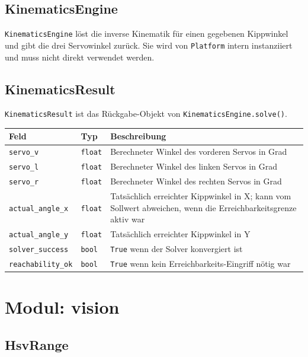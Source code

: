 \documentclass[11pt, a4paper]{scrreprt}
\begin{document}
\section{KinematicsEngine}

\texttt{KinematicsEngine} löst die inverse Kinematik für einen gegebenen
Kippwinkel und gibt die drei Servowinkel zurück.
Sie wird von \texttt{Platform} intern instanziiert und muss nicht
direkt verwendet werden.

\section{KinematicsResult}

\texttt{KinematicsResult} ist das Rückgabe-Objekt von \texttt{KinematicsEngine.solve()}.

\begin{tabularx}{\textwidth}{l l X}
  \toprule
  Feld & Typ & Beschreibung \\
  \midrule
  \texttt{servo\_v} & \texttt{float} & Berechneter Winkel des vorderen Servos in Grad \\
  \texttt{servo\_l} & \texttt{float} & Berechneter Winkel des linken Servos in Grad \\
  \texttt{servo\_r} & \texttt{float} & Berechneter Winkel des rechten Servos in Grad \\
  \texttt{actual\_angle\_x} & \texttt{float} & Tatsächlich erreichter Kippwinkel in X; kann vom Sollwert abweichen, wenn die Erreichbarkeitsgrenze aktiv war \\
  \texttt{actual\_angle\_y} & \texttt{float} & Tatsächlich erreichter Kippwinkel in Y \\
  \texttt{solver\_success} & \texttt{bool} & \texttt{True} wenn der Solver konvergiert ist \\
  \texttt{reachability\_ok} & \texttt{bool} & \texttt{True} wenn kein Erreichbarkeits-Eingriff nötig war \\
  \bottomrule
\end{tabularx}

\chapter{Modul: vision}

\section{HsvRange}
\end{document}
